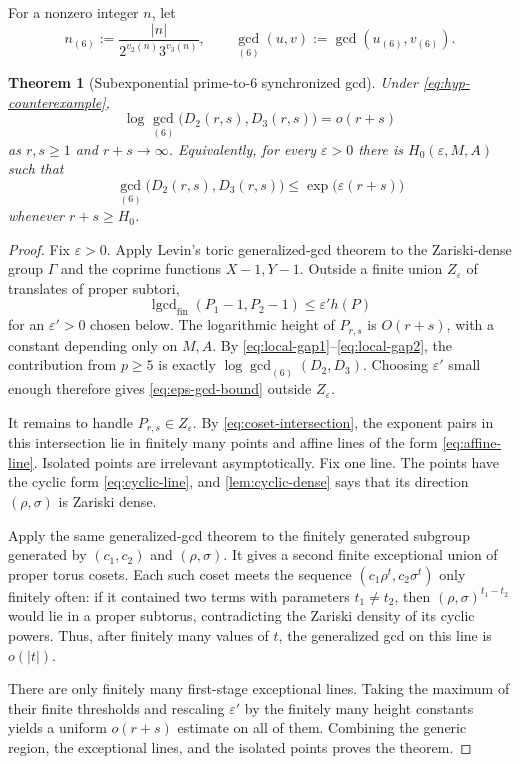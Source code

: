 \documentclass[11pt,oneside]{article}
\newtheorem{theorem}{Theorem}[section]
\theoremstyle{definition}
\newcommand{\lgcd}{\operatorname{lgcd}}
\newcommand{\eps}{\varepsilon}
\begin{document}
For a nonzero integer $n$, let
\begin{equation}\label{eq:gcd6}
  n_{(6)}:=\frac{|n|}{2^{v_2(n)}3^{v_3(n)}},
  \qquad
  \gcd_{(6)}(u,v):=\gcd(u_{(6)},v_{(6)}).
\end{equation}

\begin{theorem}[Subexponential prime-to-$6$ synchronized gcd]
\label{thm:prime-to-six-gcd}
Under \eqref{eq:hyp-counterexample},
\begin{equation}\label{eq:prime-to-six-main}
  \log\gcd_{(6)}\bigl(D_2(r,s),D_3(r,s)\bigr)=o(r+s)
\end{equation}
as $r,s\ge1$ and $r+s\to\infty$.
Equivalently, for every $\eps>0$ there is $H_0(\eps,M,A)$ such that
\begin{equation}\label{eq:eps-gcd-bound}
  \gcd_{(6)}\bigl(D_2(r,s),D_3(r,s)\bigr)
  \le \exp\bigl(\eps(r+s)\bigr)
\end{equation}
whenever $r+s\ge H_0$.
\end{theorem}

\begin{proof}
Fix $\eps>0$.  Apply Levin's toric generalized-gcd theorem to the
Zariski-dense group $\Gamma$ and the coprime functions $X-1,Y-1$.  Outside
a finite union $Z_\eps$ of translates of proper subtori,
\begin{equation}\label{eq:levin-outside}
  \lgcd_{\mathrm{fin}}(P_1-1,P_2-1)
  \le \eps' h(P)
\end{equation}
for an $\eps'>0$ chosen below.  The logarithmic height of $P_{r,s}$ is
$O(r+s)$, with a constant depending only on $M,A$.  By
\eqref{eq:local-gap1}--\eqref{eq:local-gap2}, the contribution from
$p\ge5$ is exactly
$\log\gcd_{(6)}(D_2,D_3)$.  Choosing $\eps'$ small enough therefore gives
\eqref{eq:eps-gcd-bound} outside $Z_\eps$.

It remains to handle $P_{r,s}\in Z_\eps$.  By
\eqref{eq:coset-intersection}, the exponent pairs in this intersection
lie in finitely many points and affine lines of the form
\eqref{eq:affine-line}.  Isolated points are irrelevant asymptotically.
Fix one line.  The points have the cyclic form \eqref{eq:cyclic-line}, and
\cref{lem:cyclic-dense} says that its direction $(\rho,\sigma)$ is
Zariski dense.

Apply the same generalized-gcd theorem to the finitely generated subgroup
generated by $(c_1,c_2)$ and $(\rho,\sigma)$.  It gives a second finite
exceptional union of proper torus cosets.  Each such coset meets the
sequence $(c_1\rho^t,c_2\sigma^t)$ only finitely often: if it contained
two terms with parameters $t_1\ne t_2$, then
$(\rho,\sigma)^{t_1-t_2}$ would lie in a proper subtorus, contradicting
the Zariski density of its cyclic powers.  Thus, after finitely many
values of $t$, the generalized gcd on this line is $o(|t|)$.

There are only finitely many first-stage exceptional lines.  Taking the
maximum of their finite thresholds and rescaling $\eps'$ by the finitely
many height constants yields a uniform $o(r+s)$ estimate on all of them.
Combining the generic region, the exceptional lines, and the isolated
points proves the theorem.
\end{proof}
\end{document}
